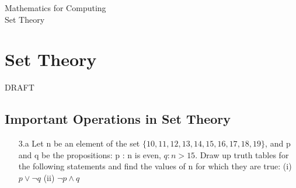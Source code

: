 \documentclass[12pt]{article}
\begin{document}
\begin{center}
\huge{Mathematics for Computing}\\
\LARGE{Set Theory}
\end{center}

\section{Set Theory}
DRAFT


\subsection{Important Operations in Set Theory}


\begin{itemize}
\item[3.a]
Let n be an element of the set $\{10, 11, 12, 13, 14, 15, 16, 17, 18, 19\}$,
and p and q be the propositions:
p : n is even, $q : n > 15$.
Draw up truth tables for the following statements and find the values of n for
which they are true:
(i) $p \vee \neg q$
(ii) $\neg p \wedge q$
\end{itemize}
\end{document}
